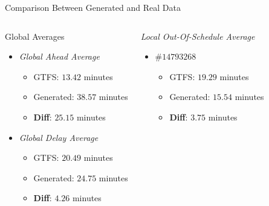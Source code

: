 \documentclass[xcolor=dvipsnames,table]{beamer}
\begin{document}
\begin{frame}{Comparison Between Generated and Real Data}
        \begin{columns}
                \begin{block}{Global Averages} 
                        \begin{itemize}
                                \item \textit{Global Ahead Average} 
                                        \begin{itemize}
                                                \item GTFS: $13.42$ minutes 
                                                \item Generated: $38.57$ minutes 
                                                \item \textbf{Diff}: $25.15$ minutes 
                                        \end{itemize}
                                \item \textit{Global Delay Average} 
                                        \begin{itemize}
                                                \item GTFS: $20.49$ minutes 
                                                \item Generated: $24.75$ minutes 
                                                \item \textbf{Diff}: $4.26$ minutes 
                                        \end{itemize}
                        \end{itemize}
                \end{block}
                \begin{block}{\textit{Local Out-Of-Schedule Average}} 
                        \begin{itemize}
                                \item $\#14793268$
                                        \begin{itemize}
                                                \item GTFS: $19.29$ minutes 
                                                \item Generated: $15.54$ minutes 
                                                \item \textbf{Diff}: $3.75$ minutes 

\end{itemize}
\end{itemize}
\end{block}
\end{columns}
\end{frame}
\end{document}
